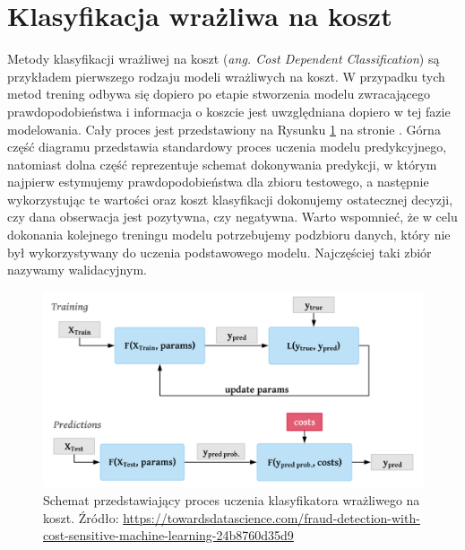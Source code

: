 \documentclass[inzynierska]{pwr_wmat_praca_dyplomowa}
\theoremstyle{plain}
\numberwithin{theorem}{chapter}
\theoremstyle{definition}
\numberwithin{theorem}{chapter}
\begin{document}
\section{Klasyfikacja wrażliwa na koszt}
Metody klasyfikacji wrażliwej na koszt (\textit{ang. Cost Dependent Classification})  są przykładem pierwszego rodzaju modeli wrażliwych na koszt. W przypadku tych metod trening odbywa się dopiero po etapie stworzenia modelu zwracającego prawdopodobieństwa i informacja o koszcie jest uwzględniana dopiero w tej fazie modelowania. Cały proces jest przedstawiony na Rysunku \ref{cdc} na stronie \pageref{cdc}. Górna część diagramu przedstawia standardowy proces uczenia modelu predykcyjnego, natomiast dolna część reprezentuje schemat dokonywania predykcji, w którym najpierw estymujemy prawdopodobieństwa dla zbioru testowego, a następnie wykorzystując te wartości oraz koszt klasyfikacji dokonujemy ostatecznej decyzji, czy dana obserwacja jest pozytywna, czy negatywna. Warto wspomnieć, że w celu dokonania kolejnego treningu modelu potrzebujemy podzbioru danych, który nie był wykorzystywany do uczenia podstawowego modelu. Najczęściej taki zbiór nazywamy walidacyjnym.
\begin{figure}
	\includegraphics[width=\linewidth]{images/cost_sensitive_classification.png}
	\caption{Schemat przedstawiający proces uczenia klasyfikatora wrażliwego na koszt. Źródło: \url{https://towardsdatascience.com/fraud-detection-with-cost-sensitive-machine-learning-24b8760d35d9}}
	\label{cdc}
\end{figure}
\end{document}
